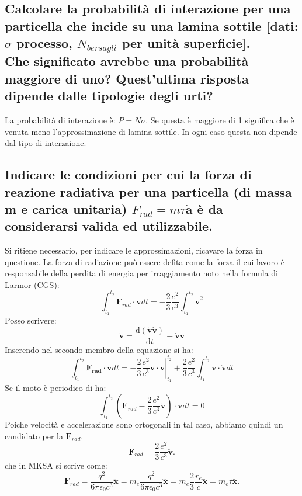 \subsection[]{ Calcolare la probabilità di interazione per una particella che incide su una lamina sottile [dati: $\sigma$ processo, $N_{bersagli}$ per unità superficie].\\
Che significato avrebbe una probabilità maggiore di uno? Quest'ultima risposta dipende dalle tipologie degli urti?}
La probabilità di interazione è: $P = N \sigma $. Se  questa è maggiore di 1 significa che è venuta meno l'approssimazione di lamina sottile. In ogni caso questa non dipende dal tipo di interzaione.

\subsection[]{ Indicare le condizioni per cui la forza di reazione radiativa per una particella (di massa m e carica unitaria) $F_{rad} = m \tau \dot{\boldsymbol{a}}$ è da considerarsi valida ed utilizzabile.} \label{subsec: 2.a.15}
Si ritiene necessario, per indicare le approssimazioni, ricavare la forza in questione. 
La forza di radiazione può essere defita come la forza il cui lavoro è responsabile della perdita di energia per irraggiamento noto nella formula di Larmor (CGS):
\[
	\int_{t_1}^{t_2} \boldsymbol{F}_{rad} \cdot \boldsymbol{v} dt = -\frac{2}{3} \frac{e^2}{c^3} \int_{t_1}^{t_2} \dot{\boldsymbol{v}}^2
\]
Posso scrivere:
\[
	\dot{\boldsymbol{v}} = \frac{\mbox{d} \left( \dot{\boldsymbol{v}} \dot{\boldsymbol{v}} \right) }{\mbox{d} t} - \dot{\boldsymbol{v}} \ddot{\boldsymbol{v}} 
\]
Inserendo nel secondo membro della equazione si ha:
\[
	\int_{t_1}^{t_2}{ \boldsymbol{F_{rad}} \cdot \boldsymbol{v} dt } = -
\left. \frac{2}{3}\frac{e^2}{c^3} \boldsymbol{v} \cdot \dot{\boldsymbol{v}}\right|_{t_{1}}^{t_{2}} + \frac{2}{3}\frac{e^2}{c^3} \int_{t_1}^{t_2} \boldsymbol{v}  \cdot \ddot{\boldsymbol{v}} dt
\] 
Se il moto è periodico di ha: 
\[
	\int_{t_1}^{t_2} \left( \boldsymbol{F}_{rad} - \frac{2}{3}\frac{e^2}{c^3}\ddot{\boldsymbol{v}} \right) \cdot \boldsymbol{v} dt = 0  
\] 
Poiche velocità e accelerazione sono ortogonali in tal caso, abbiamo quindi un candidato per la $\boldsymbol{F}_{rad}$.
\[
	\boldsymbol{F}_{rad} = \frac{2}{3}\frac{e^2}{c^3} \ddot{\boldsymbol{v}}.  
\] 
che in MKSA si scrive come:
\[
	\boldsymbol{F}_{rad} = \frac{q^2}{6\pi \epsilon_0 c^3} \dddot{\boldsymbol{x}} = m_{e}\frac{q^2}{6\pi \epsilon_0 c^3} \dddot{\boldsymbol{x}} = m_e \frac{2}{3}\frac{r_e}{c} \dddot{\boldsymbol{x}} = m_e \tau \dddot{\boldsymbol{x}} 
.\] 
